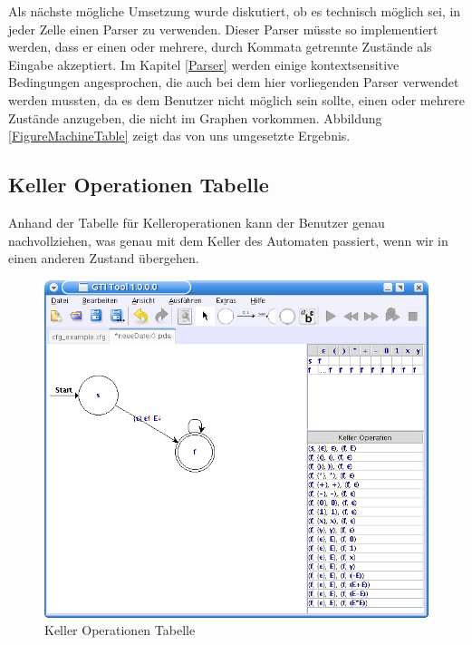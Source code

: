 Als nächste mögliche Umsetzung wurde diskutiert, ob es technisch möglich sei,
in jeder Zelle einen Parser zu verwenden. Dieser Parser müsste so implementiert
werden, dass er einen oder mehrere, durch Kommata getrennte Zustände als Eingabe
akzeptiert. Im Kapitel \ref{Parser} werden einige kontextsensitive Bedingungen
angesprochen, die auch bei dem hier vorliegenden Parser verwendet werden
mussten, da es dem Benutzer nicht möglich sein sollte, einen oder mehrere
Zustände anzugeben, die nicht im Graphen vorkommen. Abbildung
\ref{FigureMachineTable} zeigt das von uns umgesetzte Ergebnis.\vspace{10pt}


\subsection{Keller Operationen Tabelle}\label{TablesPDA}

Anhand der Tabelle für Kelleroperationen kann der Benutzer genau
nachvollziehen, was genau mit dem Keller des Automaten passiert, wenn wir
in einen anderen Zustand übergehen.\vspace{10pt}

\begin{figure}[h!]
\begin{center}
\includegraphics[width=12cm]{../images/stack_operation_table.png}
\caption{Keller Operationen Tabelle}
\label{FigureStackOperationTable}
\end{center}
\end{figure}
\vspace{10pt}

